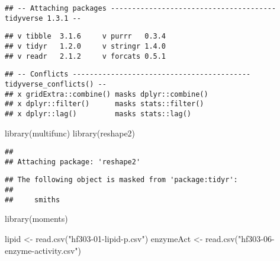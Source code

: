 \documentclass[
]{article}
\newenvironment{Shaded}{\begin{snugshade}}{\end{snugshade}}
\newcommand{\FunctionTok}[1]{\textcolor[rgb]{0.00,0.00,0.00}{#1}}
\newcommand{\NormalTok}[1]{#1}
\newcommand{\OtherTok}[1]{\textcolor[rgb]{0.56,0.35,0.01}{#1}}
\newcommand{\StringTok}[1]{\textcolor[rgb]{0.31,0.60,0.02}{#1}}
\begin{document}
\begin{verbatim}
## -- Attaching packages --------------------------------------- tidyverse 1.3.1 --
\end{verbatim}

\begin{verbatim}
## v tibble  3.1.6     v purrr   0.3.4
## v tidyr   1.2.0     v stringr 1.4.0
## v readr   2.1.2     v forcats 0.5.1
\end{verbatim}

\begin{verbatim}
## -- Conflicts ------------------------------------------ tidyverse_conflicts() --
## x gridExtra::combine() masks dplyr::combine()
## x dplyr::filter()      masks stats::filter()
## x dplyr::lag()         masks stats::lag()
\end{verbatim}

\begin{Shaded}
\begin{Highlighting}[]
\FunctionTok{library}\NormalTok{(multifunc)}
\FunctionTok{library}\NormalTok{(reshape2)}
\end{Highlighting}
\end{Shaded}

\begin{verbatim}
## 
## Attaching package: 'reshape2'
\end{verbatim}

\begin{verbatim}
## The following object is masked from 'package:tidyr':
## 
##     smiths
\end{verbatim}

\begin{Shaded}
\begin{Highlighting}[]
\FunctionTok{library}\NormalTok{(moments)}
\end{Highlighting}
\end{Shaded}

\begin{Shaded}
\begin{Highlighting}[]
\NormalTok{lipid }\OtherTok{\textless{}{-}} \FunctionTok{read.csv}\NormalTok{(}\StringTok{"hf303{-}01{-}lipid{-}p.csv"}\NormalTok{)}
\NormalTok{enzymeAct }\OtherTok{\textless{}{-}} \FunctionTok{read.csv}\NormalTok{(}\StringTok{"hf303{-}06{-}enzyme{-}activity.csv"}\NormalTok{)}
\end{Highlighting}
\end{Shaded}
\end{document}
